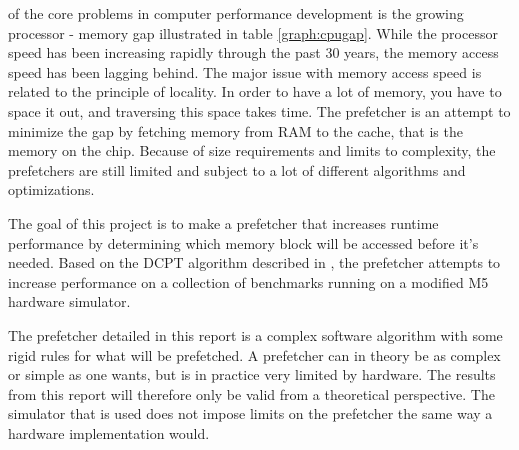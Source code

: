  of the core problems in computer performance development is the growing processor - memory gap illustrated in table \ref{graph:cpugap}. While the processor speed has been increasing rapidly through the past 30 years, the memory access speed has been lagging behind. The major issue with memory access speed is related to the principle of locality. In order to have a lot of memory, you have to space it out, and traversing this space takes time. The prefetcher is an attempt to minimize the gap by fetching memory from RAM to the cache, that is the memory on the chip. Because of size requirements and limits to complexity, the prefetchers are still limited and subject to a lot of different algorithms and optimizations.

The goal of this project is to make a prefetcher that increases runtime performance by determining which memory block will be accessed before it's needed. Based on the DCPT algorithm described in \cite{reference:jahre}, the prefetcher attempts to increase performance on a collection of benchmarks running on a modified M5 hardware simulator. 

The prefetcher detailed in this report is a complex software algorithm with some rigid rules for what will be prefetched. A prefetcher can in theory be as complex or simple as one wants, but is in practice very limited by hardware. The results from this report will therefore only be valid from a theoretical perspective. The simulator that is used does not impose limits on the prefetcher the same way a hardware implementation would.
